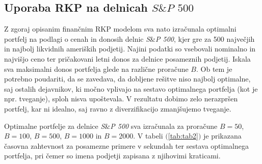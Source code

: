 \documentclass[a4paper,12pt]{article}
\theoremstyle{definition}
\begin{document}
\subsection{Uporaba RKP na delnicah $S\&P$ $500$}
Z zgoraj opisanim finančnim RKP modelom sva nato izračunala optimalni portfelj na podlagi 
o cenah in donosih delnic \textit{S}\&\textit{P 500}, kjer gre za 500 največjih in najbolj likvidnih
ameriških podjetij.  Najini 
podatki so vsebovali nominalno in najvišjo ceno ter pričakovani letni donos za delnice posameznih podjetij.
Iskala sva maksimalni donos portfelja glede na različne proračune $B$.
Ob tem je potrebno poudariti, da se zavedava, da dobljene rešitve niso najbolj optimalne, saj
ostalih dejavnikov, ki močno vplivajo na sestavo optimalnega portfelja (kot je npr. tveganje), 
sploh nisva upoštevala. V rezultatu dobimo zelo nerazpršen portfelj,
kar ni idealno, saj ravno z diverzifikacijo zmanjšujemo tveganje. 
\par
Optimalne portfelje za delnice \textit{S}\&\textit{P 500} sva izračunala za proračune $B = 50$, $B = 100$, $B = 500$,
$B = 1000$ in $B = 2000$. V tabeli $($\ref{tab:tab2}$)$ je prikazana časovna zahtevnost za posamezne 
primere v sekundah ter sestava optimalnega portfelja, pri čemer so imena podjetji zapisana z njihovimi
kraticami. 
\end{document}
